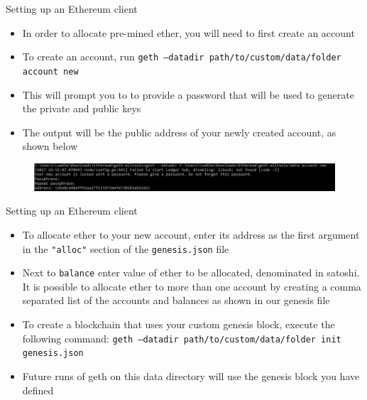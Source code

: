 \documentclass[9pt]{beamer}
\begin{document}
\begin{frame}{Setting up an Ethereum client}
	\begin{itemize}
		\item In order to allocate pre-mined ether, you will need to first create an account
		\item To create an account, run \texttt{geth ---datadir path/to/custom/data/folder account new}
		\item This will prompt you to to provide a password that will be used to generate the private and public keys
		\item The output will be the public address of your newly created account, as shown below
	\end{itemize}
	\begin{figure}[]
		\centering
		\includegraphics  [scale=0.4]{Images/geth5}
	\end{figure}
\end{frame}


\begin{frame}{Setting up an Ethereum client}
	\begin{itemize}
		\item To allocate ether to your new account, enter its address as the first argument in the \texttt{"alloc"} section of the \texttt{genesis.json} file
		\item Next to \texttt{balance} enter value of ether to be allocated, denominated in satoshi. It is possible to allocate ether to more than one account by creating a comma separated list of the accounts and balances as shown in our genesis file
		\item To create a blockchain that uses your custom genesis block, execute the following command: \texttt{geth ---datadir path/to/custom/data/folder init genesis.json}
		\item Future runs of geth on this data directory will use the genesis block you have defined
	\end{itemize}
\end{frame}

\end{document}
